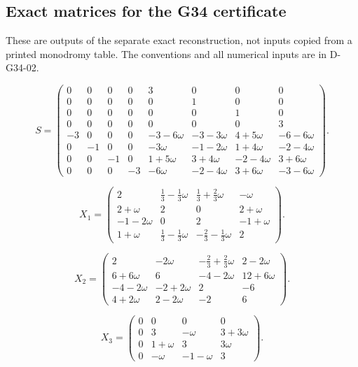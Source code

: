 \subsection*{Exact matrices for the G34 certificate}

These are outputs of the separate exact reconstruction, not inputs copied from a printed monodromy table. The conventions and all numerical inputs are in D-G34-02.

\[ S=\begin{pmatrix}
0 & 0 & 0 & 0 & 3 & 0 & 0 & 0 \\
0 & 0 & 0 & 0 & 0 & 1 & 0 & 0 \\
0 & 0 & 0 & 0 & 0 & 0 & 1 & 0 \\
0 & 0 & 0 & 0 & 0 & 0 & 0 & 3 \\
-3 & 0 & 0 & 0 & -3-6\omega & -3-3\omega & 4+5\omega & -6-6\omega \\
0 & -1 & 0 & 0 & -3\omega & -1-2\omega & 1+4\omega & -2-4\omega \\
0 & 0 & -1 & 0 & 1+5\omega & 3+4\omega & -2-4\omega & 3+6\omega \\
0 & 0 & 0 & -3 & -6\omega & -2-4\omega & 3+6\omega & -3-6\omega
\end{pmatrix}.\]

\[ X_{1}=\begin{pmatrix}
2 & \frac{1}{3}-\frac{1}{3}\omega & \frac{1}{3}+\frac{2}{3}\omega & -\omega \\
2+\omega & 2 & 0 & 2+\omega \\
-1-2\omega & 0 & 2 & -1+\omega \\
1+\omega & \frac{1}{3}-\frac{1}{3}\omega & -\frac{2}{3}-\frac{1}{3}\omega & 2
\end{pmatrix}.\]

\[ X_{2}=\begin{pmatrix}
2 & -2\omega & -\frac{2}{3}+\frac{2}{3}\omega & 2-2\omega \\
6+6\omega & 6 & -4-2\omega & 12+6\omega \\
-4-2\omega & -2+2\omega & 2 & -6 \\
4+2\omega & 2-2\omega & -2 & 6
\end{pmatrix}.\]

\[ X_{3}=\begin{pmatrix}
0 & 0 & 0 & 0 \\
0 & 3 & -\omega & 3+3\omega \\
0 & 1+\omega & 3 & 3\omega \\
0 & -\omega & -1-\omega & 3
\end{pmatrix}.\]

